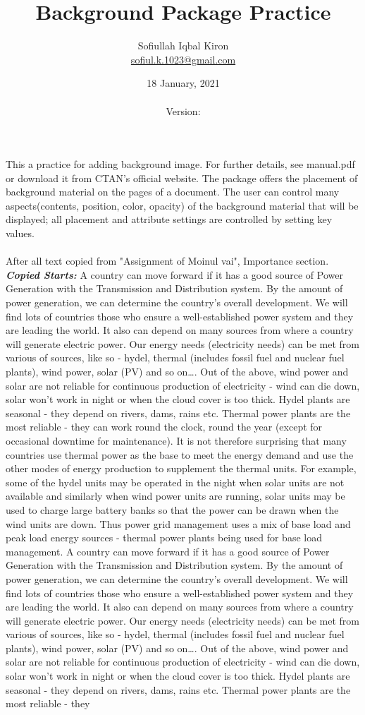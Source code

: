 \documentclass[10pt, a4paper]{article}
\title{Background Package Practice}
\author
{
	Sofiullah Iqbal Kiron\\
	\href{mailto:sofiul.k.1023@gmail.com}{sofiul.k.1023@gmail.com}
}
\date{18 January, 2021 \\ \currenttime \\ Version: \version}
\affil
{
	BSMRSTU, Department of CSE \\
	SHIICT \\
	{\tiny Copyright\faCopyright\hspace{2pt} under Sofiullah Book Agency Publishing Section}
}
\begin{document}
\maketitle

\justify
This a practice for adding background image. For further details, see manual.pdf or download it from CTAN's official website. The package offers the placement of background material on the pages of a document. The user can control many aspects(contents, position, color, opacity) of the background material that will be displayed; all placement and attribute settings are controlled by setting key values. \\ \\
After all text copied from "Assignment of Moinul vai", Importance section. \textit{\textbf{Copied Starts:}} A country can move forward if it has a good source of Power Generation with the Transmission and Distribution system. By the amount of power generation, we can determine the country’s overall development. We will find lots of countries those who ensure a well-established power system and they are leading the world. It also can depend on many sources from where a country will generate electric power. Our energy needs (electricity needs) can be met from various of sources, like so - hydel, thermal (includes fossil fuel and nuclear fuel plants), wind power, solar (PV) and so on\dots. Out of the above, wind power and solar are not reliable for continuous production of electricity - wind can die down, solar won’t work in night or when the cloud cover is too thick. Hydel plants are seasonal - they depend on rivers, dams, rains etc. Thermal power plants are the most reliable - they can work round the clock, round the year (except for occasional downtime for maintenance). It is not therefore surprising that many countries use thermal power as the base to meet the energy demand and use the other modes of energy production to supplement the thermal units. For example, some of the hydel units may be operated in the night when solar units are not available and similarly when wind power units are running, solar units may be used to charge large battery banks so that the power can be drawn when the wind units are down. Thus power grid management uses a mix of base load and peak load energy sources - thermal power plants being used for base load management. A country can move forward if it has a good source of Power Generation with the Transmission and Distribution system. By the amount of power generation, we can determine the country’s overall development. We will find lots of countries those who ensure a well-established power system and they are leading the world. It also can depend on many sources from where a country will generate electric power. Our energy needs (electricity needs) can be met from various of sources, like so - hydel, thermal (includes fossil fuel and nuclear fuel plants), wind power, solar (PV) and so on\dots. Out of the above, wind power and solar are not reliable for continuous production of electricity - wind can die down, solar won’t work in night or when the cloud cover is too thick. Hydel plants are seasonal - they depend on rivers, dams, rains etc. Thermal power plants are the most reliable - they 
\end{document}
